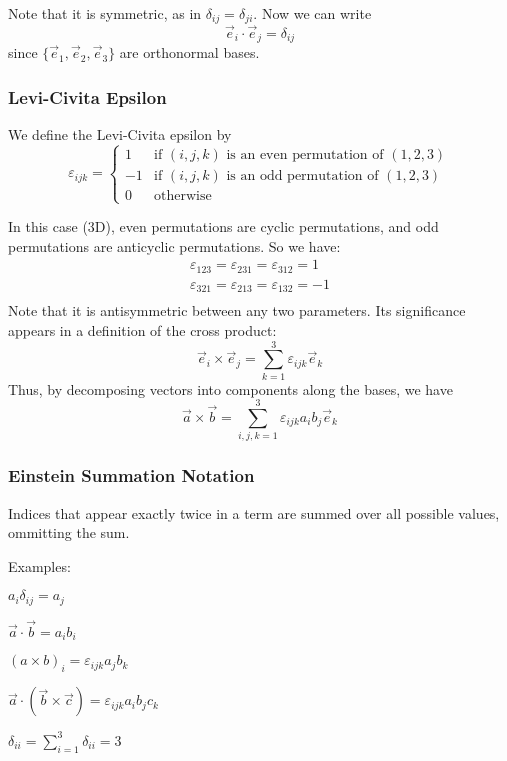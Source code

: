 \documentclass[12pt]{article}
\begin{document}
Note that it is symmetric, as in $\delta_{ij} = \delta_{ji}$. Now we can write
\[
    \vec{e}_i \cdot \vec{e}_j = \delta_{ij}
\]
since $\{\vec{e}_1, \vec{e}_2, \vec{e}_3\}$ are orthonormal bases.

\subsubsection*{Levi-Civita Epsilon}
\begin{definition}
    We define the Levi-Civita epsilon by
    \[
        \varepsilon_{ijk} = \begin{cases}
            1 & \text{if } (i,j,k) \text{ is an even permutation of } (1,2,3)\\
            -1 & \text{if } (i,j,k) \text{ is an odd permutation of } (1,2,3)\\
            0 & \text{otherwise}
        \end{cases}
    \]
\end{definition}
In this case (3D), even permutations are cyclic permutations,
and odd permutations are anticyclic permutations. So we have:
\begin{align*}
    \varepsilon_{123} = \varepsilon_{231} = \varepsilon_{312} = 1\\
    \varepsilon_{321} = \varepsilon_{213} = \varepsilon_{132} = -1\\
\end{align*}
Note that it is antisymmetric between any two parameters. 
Its significance appears in a definition of the cross product:
\[
    \vec{e}_i \times \vec{e}_j = \sum_{k=1}^{3}\varepsilon _{ijk} \vec{e}_k
\]
Thus, by decomposing vectors into components along the bases, we have
\[
    \vec{a} \times \vec{b} = \sum_{i,j,k=1}^{3}\varepsilon _{ijk} a_i b_j \vec{e}_k
\]

\subsubsection*{Einstein Summation Notation}

Indices that appear exactly twice in a term are
summed over all possible values, ommitting the sum.

Examples:
\begin{compactenum}[(i)]
\item $a_i \delta_{ij} = a_j$
\item $\vec{a} \cdot \vec{b} = a_i b_i$
\item $(a \times b)_i = \varepsilon_{ijk}a_jb_k$
\item $\vec{a} \cdot (\vec{b} \times \vec{c}) = \varepsilon _{ijk}a_ib_jc_k$
\item $\delta _{ii} = \sum_{i=1}^{3}\delta_{ii} = 3$
\end{compactenum}
\end{document}
